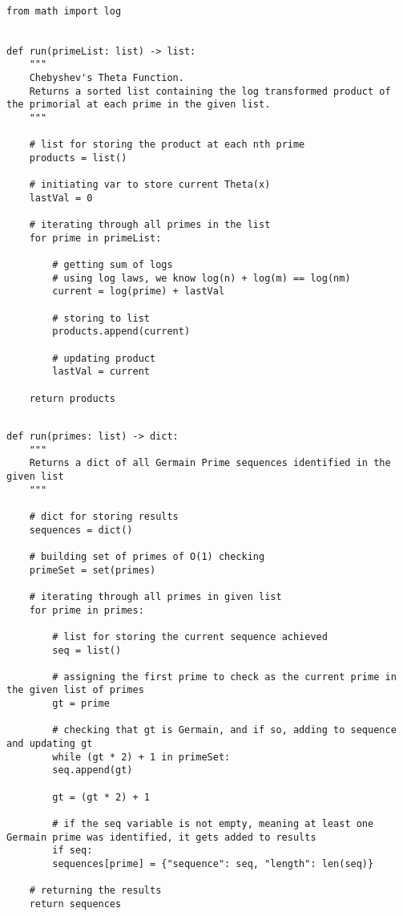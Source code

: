\documentclass[11pt]{article}
\begin{document}
\begin{lstlisting}

from math import log


def run(primeList: list) -> list:
	"""
	Chebyshev's Theta Function.
	Returns a sorted list containing the log transformed product of the primorial at each prime in the given list.
	"""

	# list for storing the product at each nth prime
	products = list()

	# initiating var to store current Theta(x)
	lastVal = 0

	# iterating through all primes in the list
	for prime in primeList:

		# getting sum of logs
		# using log laws, we know log(n) + log(m) == log(nm)
		current = log(prime) + lastVal
		
		# storing to list
		products.append(current)
		
		# updating product
		lastVal = current

	return products

\end{lstlisting}

\newpage

\lstset{style = GermainSequence}

\begin{lstlisting}

def run(primes: list) -> dict:
	"""
	Returns a dict of all Germain Prime sequences identified in the given list
	"""

	# dict for storing results
	sequences = dict()
	
	# building set of primes of O(1) checking
	primeSet = set(primes)
	
	# iterating through all primes in given list
	for prime in primes:

		# list for storing the current sequence achieved
		seq = list()
		
		# assigning the first prime to check as the current prime in the given list of primes
		gt = prime
		
		# checking that gt is Germain, and if so, adding to sequence and updating gt
		while (gt * 2) + 1 in primeSet:
		seq.append(gt)
		
		gt = (gt * 2) + 1
		
		# if the seq variable is not empty, meaning at least one Germain prime was identified, it gets added to results
		if seq:
		sequences[prime] = {"sequence": seq, "length": len(seq)}

	# returning the results
	return sequences

\end{lstlisting}
\end{document}
